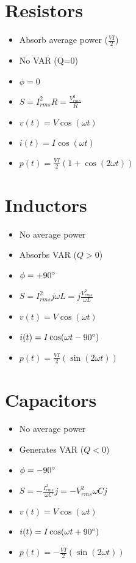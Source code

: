 \documentclass [12pt] {article}
\begin{document}
\begin{multicols*}{2}
\section{Resistors}
	\begin{itemize}
		\item Absorb average power ($\frac{VI}{2}$)
		\item No VAR (Q=0) 
		\item $\phi = 0$
		\item $S = I_{rms}^2R = \frac{V_{rms}^2}{R}$
		\item $v(t) = V\cos(\omega t)$
		\item $i(t) = I\cos(\omega t)$
		\item $p(t) = \frac{VI}{2}(1 + \cos(2\omega t))$
	\end{itemize}
\section{Inductors}
	\begin{itemize}
		\item No average power
		\item Absorbs VAR ($Q>0$)
		\item $\phi = +90\degree$
		\item $S = I_{rms}^2j\omega L = j\frac{V_{rms}^2}{\omega L}$
		\item $v(t) = V\cos(\omega t)$
		\item $i(t) = I\cos(\omega t - 90\degree)$
		\item $p(t) = \frac{VI}{2}(\sin(2\omega t))$
	\end{itemize}
\section{Capacitors}
	\begin{itemize}
		\item No average power
		\item Generates VAR ($Q<0$)
		\item $\phi = -90\degree$
		\item $S = -\frac{I_{rms}^2}{\omega C}j = -V_{rms}^2\omega Cj$
		\item $v(t) = V\cos(\omega t)$
		\item $i(t) = I\cos(\omega t + 90\degree)$
		\item $p(t) = -\frac{VI}{2}(\sin(2\omega t))$
	\end{itemize}

\end{multicols*}
\end{document}
